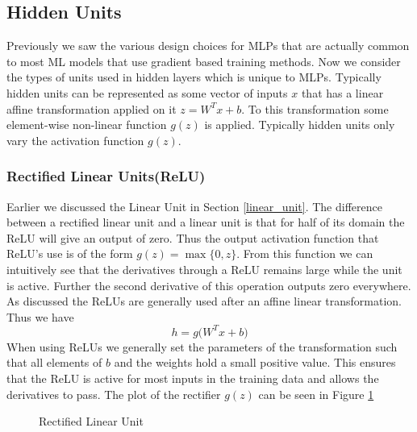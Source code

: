\documentclass[14pt]{extarticle}
\numberwithin{equation}{section}
\begin{document}
	\subsection{Hidden Units}
	Previously we saw the various design choices for MLPs that are actually common to most ML models that use gradient based training methods. Now we consider the types of units used in hidden layers which is unique to MLPs. Typically hidden units can be represented as some vector of inputs $x$ that has a linear affine transformation applied on it $z = W^Tx + b$. To this transformation some element-wise non-linear function $g(z)$ is applied. Typically hidden units only vary the activation function $g(z)$.
	\subsubsection{Rectified Linear Units(ReLU)}
	Earlier we discussed the Linear Unit in Section \ref{linear_unit}. The difference between a rectified linear unit and a linear unit is that for half of its domain the ReLU will give an output of zero. Thus the output activation function that ReLU's use is of the form $g(z) = \max \{0,z\}$. From this function we can intuitively see that the derivatives through a ReLU remains large while the unit is active. Further the second derivative of this operation outputs zero everywhere. As discussed the ReLUs are generally used after an affine linear transformation. Thus we have
	\begin{equation}
	h = g\big(W^Tx + b\big)
	\end{equation}
	When using ReLUs we generally set the parameters of the transformation such that all elements of $b$ and the weights hold a small positive value. This ensures that the ReLU is active for most inputs in the training data and allows the derivatives to pass. The plot of the rectifier $g(z)$ can be seen in Figure \ref{relu}
	\begin{figure}[H]
		\centering
		\setlength{\fboxsep}{5pt}%
		\setlength{\fboxrule}{1pt}%
		\caption{Rectified Linear Unit
			\label{relu}}
	\end{figure}
\end{document}
